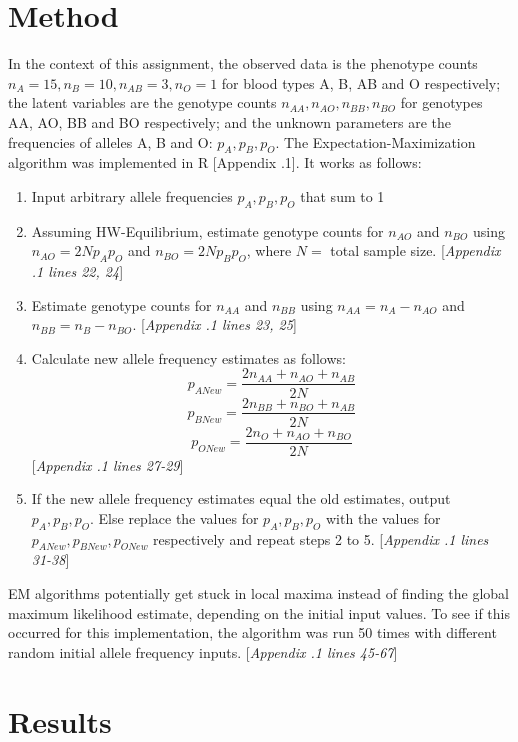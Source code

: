 \documentclass{article}
\begin{document}
	\section{Method}
	
	In the context of this assignment, the observed data is the phenotype counts $n_A = 15, n_B = 10, n_{AB} = 3, n_O = 1$ for blood types A, B, AB and O respectively; the latent variables are the genotype counts $n_{AA}, n_{AO}, n_{BB}, n_{BO}$ for genotypes AA, AO, BB and BO respectively; and the unknown parameters are the frequencies of alleles A, B and O: $p_A, p_B, p_O$. The Expectation-Maximization algorithm was implemented in R [Appendix .1]. It works as follows:
	
	\begin{enumerate}
		\item Input arbitrary allele frequencies $p_A, p_B, p_O$ that sum to 1
		\item Assuming HW-Equilibrium, estimate genotype counts for $n_{AO}$ and $n_{BO}$ using $n_{AO} = 2Np_Ap_O$ and $n_{BO} = 2Np_Bp_O$, where $N =$ total sample size. [\emph{Appendix .1 lines 22, 24}]
		\item Estimate genotype counts for $n_{AA}$ and $n_{BB}$ using $n_{AA} = n_{A} - n_{AO}$ and $n_{BB} = n_{B} - n_{BO}$. [\emph{Appendix .1 lines 23, 25}]
		\item Calculate new allele frequency estimates as follows:
		\[p_{ANew} = \frac{2n_{AA} + n_{AO} + n_{AB}}{2N}\]
		\[p_{BNew} = \frac{2n_{BB} + n_{BO} + n_{AB}}{2N}\]		
		\[p_{ONew} = \frac{2n_{O} + n_{AO} + n_{BO}}{2N}\]	
		[\emph{Appendix .1 lines 27-29}]
		\item If the new allele frequency estimates equal the old estimates, output $p_A, p_B, p_O$. Else replace the values for $p_A, p_B, p_O$ with the values for $p_{ANew}, p_{BNew}, p_{ONew}$ respectively and repeat steps 2 to 5. [\emph{Appendix .1 lines 31-38}]
		
	\end{enumerate}

	EM algorithms potentially get stuck in local maxima instead of finding the global maximum likelihood estimate, depending on the initial input values. To see if this occurred for this implementation, the algorithm was run 50 times with different random initial allele frequency inputs. [\emph{Appendix .1 lines 45-67}]
	 
	\section{Results}
	
\end{document}
